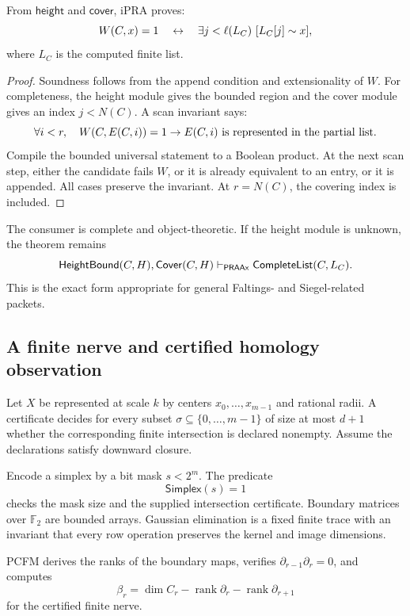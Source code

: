 \begin{theorem}
From \(\mathsf{height}\) and \(\mathsf{cover}\), iPRA proves:
\[
 W(C,x)=1
 \quad\leftrightarrow\quad
 \exists j<\ell(L_C)\ [L_C[j]\sim x],
\]
where \(L_C\) is the computed finite list.
\end{theorem}

\begin{proof}
Soundness follows from the append condition and extensionality of \(W\).
For completeness, the height module gives the bounded region and the cover
module gives an index \(j<N(C)\).  A scan invariant says:
\[
 \forall i<r,\quad
 W(C,E(C,i))=1
 \rightarrow E(C,i)\text{ is represented in the partial list}.
\]
Compile the bounded universal statement to a Boolean product.  At the next
scan step, either the candidate fails \(W\), or it is already equivalent to an
entry, or it is appended.  All cases preserve the invariant.  At \(r=N(C)\),
the covering index is included.
\end{proof}

The consumer is complete and object-theoretic.  If the height module is
unknown, the theorem remains
\[
  \mathsf{HeightBound}(C,H),\mathsf{Cover}(C,H)
   \vdash_{\mathsf{PRAAx}}\mathsf{CompleteList}(C,L_C).
\]
This is the exact form appropriate for general Faltings- and Siegel-related
packets.

\subsection{A finite nerve and certified homology observation}

Let \(X\) be represented at scale \(k\) by centers
\(x_0,\ldots,x_{m-1}\) and rational radii.  A certificate decides for every
subset \(\sigma\subseteq\{0,\ldots,m-1\}\) of size at most \(d+1\) whether the
corresponding finite intersection is declared nonempty.  Assume the declarations
satisfy downward closure.

Encode a simplex by a bit mask \(s<2^m\).  The predicate
\[
   \mathsf{Simplex}(s)=1
\]
checks the mask size and the supplied intersection certificate.  Boundary
matrices over \(\mathbb F_2\) are bounded arrays.  Gaussian elimination is a
fixed finite trace with an invariant that every row operation preserves the
kernel and image dimensions.

\begin{theorem}
PCFM derives the ranks of the boundary maps, verifies
\(\partial_{r-1}\partial_r=0\), and computes
\[
   \beta_r
     = \dim C_r-\operatorname{rank}\partial_r
       -\operatorname{rank}\partial_{r+1}
\]
for the certified finite nerve.
\end{theorem}

